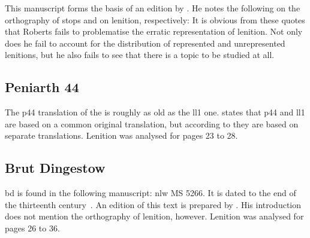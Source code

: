 This manuscript forms the basis of an edition
by \textcite{roberts_brut_1971}.  He notes the following on the
orthography of stops and on lenition, respectively:
It is obvious from these quotes that Roberts fails to problematise the
erratic representation of lenition.  Not only does he fail to account
for the distribution of represented and unrepresented lenitions, but
he also fails to see that there is a topic to be studied at all.



\subsection{Peniarth 44}
The \gls{p44} translation of the  is roughly as old as the \gls{ll1} one.
\Textcite{lewis_brut_1942} states that \gls{p44} and \gls{ll1} are based on a common original translation,
but according to \textcite[xliii--xliv]{roberts_astudiaeth_1969}  they are based on separate translations.
Lenition was analysed for pages 23 to 28.
\subsection{Brut Dingestow}
\label{sec:dingestow}
\Gls{bd} is found in the following manuscript: \gls{nlw} MS 5266.  It
is dated to the end of the thirteenth century~\autocite[xliii]{roberts_astudiaeth_1969}.
An edition of this text is prepared by \textcite{lewis_brut_1942}.  His
introduction does not mention the orthography of lenition, however.
Lenition was analysed for pages 26 to 36.

